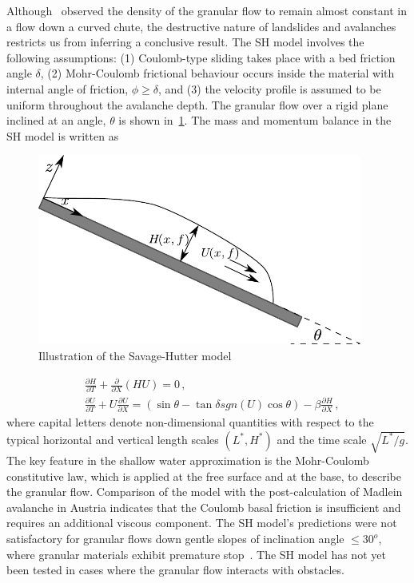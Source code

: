 Although~\citet{Hutter1995} observed the density of the granular flow to remain 
almost constant in a flow down a curved chute, the destructive nature of 
landslides and avalanches restricts us from inferring a conclusive result. The 
SH model involves the following assumptions: (1) Coulomb-type sliding takes 
place with a bed friction angle $\delta$, (2) Mohr-Coulomb frictional behaviour 
occurs inside the material with internal angle of friction, $\phi \ge \delta$, 
and (3) the velocity profile is assumed to be uniform throughout the avalanche 
depth. The granular flow over a rigid plane inclined at an angle, $\theta$ is 
shown in~\cref{fig:SH}. The mass and momentum balance in the SH model is 
written as
%
\begin{figure}[htbp]
\centering
\includegraphics[width=0.95\textwidth]{SH}
\caption{Illustration of the Savage-Hutter model}
\label{fig:SH}
\end{figure}
%
\begin{align}
&\frac{\partial \textit{H}}{\partial \textit{T}} + \frac{\partial}{\partial 
\textit{X}} (\textit{HU})  =  0 \,, \\
&\frac{\partial \textit{U}}{\partial \textit{T}} + \textit{U} \frac{\partial 
\textit{U}}{\partial \textit{X}}  = (\sin \theta - \tan \delta 
\textit{sgn}(\textit{U}) \cos \theta) -\beta \frac{\partial 
\textit{H}}{\partial \textit{X}} \,,
\end{align}
%
where capital letters denote non-dimensional quantities with respect to the 
typical horizontal and vertical length scales $(\textit{L}^{*},\textit{H}^{*})$ 
and the time scale $\sqrt{\textit{L}^{*}/\textit{g}}$. The key feature in the 
shallow water approximation is the Mohr-Coulomb constitutive law, which is 
applied at the free surface and at the base, to describe the granular flow. 
Comparison of the model with the post-calculation of Madlein avalanche in 
Austria indicates that the Coulomb basal friction is insufficient and requires 
an additional viscous component. The SH model's predictions were not 
satisfactory for granular flows down gentle slopes of inclination angle $\le 
30^{o}$, where granular materials exhibit premature stop~\citep{Hutter2005}. 
The SH model has not yet been tested in cases where the granular flow interacts 
with obstacles.

